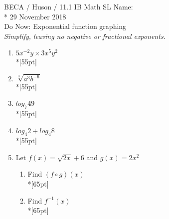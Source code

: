 \documentclass[]{book}
\begin{document}
\noindent BECA / Huson / 11.1 IB Math SL \hspace{2in} Name:\\*
29 November 2018\\[0.5cm]
Do Now: Exponential function graphing\\
\textit{Simplify, leaving no negative or fractional exponents.}\\


\begin{enumerate}

  \item $5x^{-2}y \times 3x^5 y^{2}$\\*[55pt]
  \item $\sqrt[3]{a^3 b^{-6}}$\\*[55pt]
  \item $log_7 49$\\*[55pt]
  \item $log_4 2 + log_4 8$\\*[55pt]


  \item Let $f(x) = \sqrt{2x} +6$ and $g(x)=2x^2$
  \begin{enumerate}
      \item Find $(f \circ g)(x)$\\*[65pt]
      \item Find $f^{-1}(x)$\\*[65pt]
  \end{enumerate}

\end{enumerate}
\newpage
\end{document}
